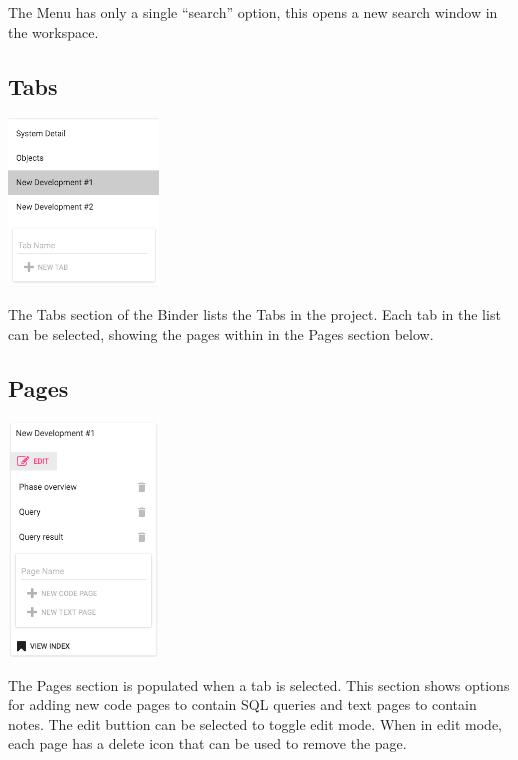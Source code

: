   The Menu has only a single ``search'' option, this opens a new search window
  in the workspace.

\subsection{Tabs}

  \begin{center}
  \includegraphics[width=0.3\textwidth]{Figures/Binder-Tabs.png}
  \end{center}

  The Tabs section of the Binder lists the Tabs in the project. Each tab in the
  list can be selected, showing the pages within in the Pages section below.

\subsection{Pages}

  \begin{center}
  \includegraphics[width=0.3\textwidth]{Figures/Binder-Pages.png}
  \end{center}

  The Pages section is populated when a tab is selected. This section shows
  options for adding new code pages to contain SQL queries and text pages 
  to contain notes. The edit buttion can be selected to toggle edit mode. When
  in edit mode, each page has a delete icon that can be used to remove the page.

